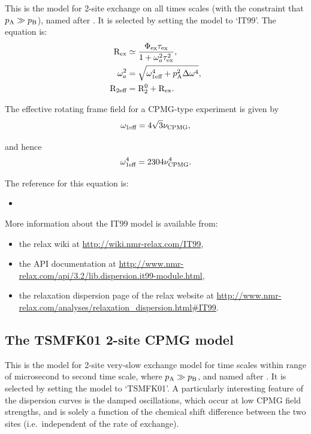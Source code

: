 This is the model for 2-site exchange on all times scales (with the constraint that $p_{\textrm{A}} \gg p_{\textrm{B}}$), named after \citet{IshimaTorchia99}.
It is selected by setting the model to `IT99'.
The equation is:
\begin{align}
    \mathrm{R}_{\textrm{ex}}       &\simeq \frac{\Phi_{\textrm{ex}}\tau_{\textrm{ex}}}{1 + \omega_a^2\tau_{\textrm{ex}}^2} , \\
    \omega_a^2 &= \sqrt{\omega_{\textrm{1eff}}^4 + p_{\textrm{A}}^2\Delta\omega^4} , \\
    \mathrm{R}_{\textrm{2eff}}   &= \mathrm{R}_2^0 + \mathrm{R}_{\textrm{ex}} .
\end{align}

The effective rotating frame field for a CPMG-type experiment is given by
\begin{equation}
    \omega_{\textrm{1eff}} = 4\sqrt{3}\nu_{\textrm{CPMG}} ,
\end{equation}

and hence
\begin{equation}
    \omega_{\textrm{1eff}}^4 = 2304\nu_{\textrm{CPMG}}^4 .
\end{equation}

The reference for this equation is:
\begin{itemize}
  \item {}
\end{itemize}

More information about the IT99 model is available from:
\begin{itemize}
  \item the relax wiki at \url{http://wiki.nmr-relax.com/IT99},
  \item the API documentation at \url{http://www.nmr-relax.com/api/3.2/lib.dispersion.it99-module.html},
  \item the relaxation dispersion page of the relax website at \url{http://www.nmr-relax.com/analyses/relaxation\_dispersion.html#IT99}.
\end{itemize}



\subsection{The TSMFK01 2-site CPMG model}
\label{sect: dispersion: TSMFK01 model}

This is the model for 2-site very-slow exchange model for time scales within range of microsecond to second time scale, where $p_{\textrm{A}} \gg p_{\textrm{B}}$, and named after \citet{Tollinger01}.
It is selected by setting the model to `TSMFK01'.
A particularly interesting feature of the dispersion curves is the damped oscillations, which occur at low CPMG field strengths, and is solely a function of the chemical shift difference between the two sites (i.e.\ independent of the rate of exchange).


